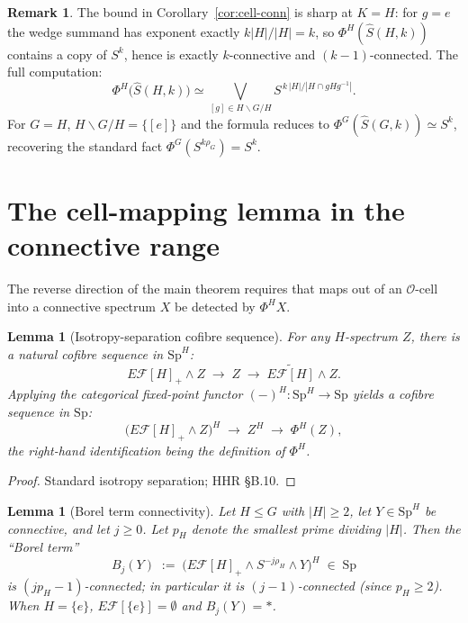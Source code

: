 \documentclass[12pt]{article}
\newtheorem{lemma}[theorem]{Lemma}
\theoremstyle{definition}
\newtheorem{remark}[theorem]{Remark}
\newcommand{\SpH}{\mathrm{Sp}^{H}}
\newcommand{\Spec}{\mathrm{Sp}}
\newcommand{\PhiH}{\Phi^{H}}
\newcommand{\PhiG}{\Phi^{G}}
\newcommand{\OO}{\mathcal{O}}
\newcommand{\fix}[1]{\widetilde{E\mathcal{F}[#1]}}
\newcommand{\Esub}[1]{E\mathcal{F}[#1]}
\begin{document}
\begin{remark}\label{rem:sharp}
The bound in Corollary~\ref{cor:cell-conn} is sharp at $K=H$: for $g=e$ the
wedge summand has exponent exactly $k|H|/|H|=k$, so $\PhiH(\widehat{S}(H,k))$
contains a copy of $S^{k}$, hence is exactly $k$-connective and
$(k-1)$-connected. The full computation:
\[
\PhiH\bigl(\widehat{S}(H,k)\bigr)\simeq\bigvee_{[g]\in H\backslash G/H}
S^{\,k\,|H|/|H\cap gHg^{-1}|}.
\]
For $G=H$, $H\backslash G/H=\{[e]\}$ and the formula reduces to
$\PhiG(\widehat{S}(G,k))\simeq S^{k}$, recovering the standard fact
$\PhiG(S^{k\rho_{G}})=S^{k}$.
\end{remark}

\section{The cell-mapping lemma in the connective range}\label{sec:cell-map}

The reverse direction of the main theorem requires that maps out of an
$\OO$-cell into a connective spectrum $X$ be detected by $\PhiH X$.

\begin{lemma}[Isotropy-separation cofibre sequence]\label{lem:isotrop}
For any $H$-spectrum $Z$, there is a natural cofibre sequence in $\SpH$:
\begin{equation}
\Esub{H}_{+}\wedge Z\;\to\;Z\;\to\;\fix{H}\wedge Z.
\label{eq:isotrop}
\end{equation}
Applying the categorical fixed-point functor $(-)^{H}\colon\SpH\to\Spec$
yields a cofibre sequence in $\Spec$:
\begin{equation}
\bigl(\Esub{H}_{+}\wedge Z\bigr)^{H}\;\to\;Z^{H}\;\to\;\PhiH(Z),
\label{eq:fix-cof}
\end{equation}
the right-hand identification being the definition of $\PhiH$.
\end{lemma}

\begin{proof}
Standard isotropy separation; HHR §B.10.
\end{proof}

\begin{lemma}[Borel term connectivity]\label{lem:Borel-conn}
Let $H\leq G$ with $|H|\geq 2$, let $Y\in\SpH$ be connective, and let
$j\geq 0$. Let $p_{H}$ denote the smallest prime dividing $|H|$. Then the
``Borel term''
\begin{equation}
B_{j}(Y)\;:=\;\bigl(\Esub{H}_{+}\wedge S^{-j\rho_{H}}\wedge Y\bigr)^{H}
\;\in\;\Spec
\label{eq:Borel-def}
\end{equation}
is $(jp_{H}-1)$-connected; in particular it is $(j-1)$-connected
\textup{(}since $p_{H}\geq 2$\textup{)}. When $H=\{e\}$, $\Esub{\{e\}}=\emptyset$ and
$B_{j}(Y)=\ast$.
\end{lemma}
\end{document}
